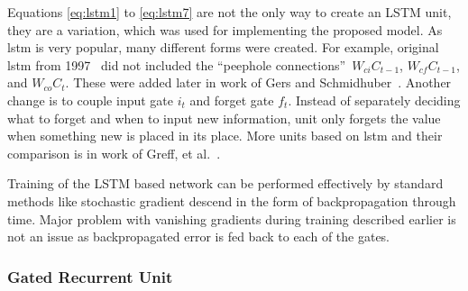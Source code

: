 Equations \eqref{eq:lstm1} to \eqref{eq:lstm7} are not the only way to create an LSTM unit, they are a variation, which was used for implementing the proposed model. As \gls{lstm} is very popular, many different forms were created. For example, original \gls{lstm} from 1997~\cite{Hochreiter:1997:LSM:1246443.1246450} did not included the \textquotedblleft peephole connections\textquotedblright\ $ W_{ci}C_{t-1} $, $ W_{cf}C_{t-1} $, and $ W_{co}C_t $. These were added later in work of Gers and Schmidhuber~\cite{DBLP:conf/ijcnn/GersS00}. Another change is to couple input gate $ i_t $ and forget gate $ f_t $. Instead of separately deciding what to forget and when to input new information, unit only forgets the value when something new is placed in its place. More units based on \gls{lstm} and their comparison is in work of Greff, et al.~\cite{DBLP:journals/corr/GreffSKSS15}.

Training of the LSTM based network can be performed effectively by standard methods like stochastic gradient descend in the form of backpropagation through time. Major problem with vanishing gradients during training described earlier is not an issue as backpropagated error is fed back to each of the gates.

\subsubsection{Gated Recurrent Unit}\label{subsubsec:gru}

